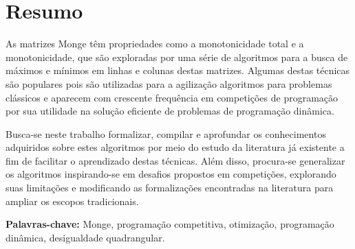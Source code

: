 \chapter*{Resumo}
\label{Resumo}

As matrizes Monge têm propriedades como a monotonicidade total e a monotonicidade, que são exploradas por uma série de algoritmos para a busca de máximos e mínimos em linhas e colunas destas matrizes. Algumas destas técnicas são populares pois são utilizadas para a agilização algoritmos para problemas clássicos e aparecem com crescente frequência em competições de programação por sua utilidade na solução eficiente de problemas de programação dinâmica.

Busca-se neste trabalho formalizar, compilar e aprofundar os conhecimentos adquiridos sobre estes algoritmos por meio do estudo da literatura já existente a fim de facilitar o aprendizado destas técnicas. Além disso, procura-se generalizar os algoritmos inspirando-se em desafios propostos em competições, explorando suas limitações e modificando as formalizações encontradas na literatura para ampliar os escopos tradicionais. 

\textbf{Palavras-chave:} Monge, programação competitiva, otimização, programação dinâmica, desigualdade quadrangular.

%
%
%
